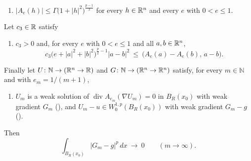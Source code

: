 \begin{helper}
\begin{enumerate}
  $|A(h)|\le\Gamma\bigl(1+|h|^2\bigr)^{\frac{p-1}2}$ for every $h\in\R^n$;
\item[(H13)] $|A_e(h)|\le\Gamma\bigl(1+|h|^2\bigr)^{\frac{p-1}2}$ for every
  $h\in\R^n$ and every $e$ with $0<e\le1$.
\end{enumerate}
Let $c_3\in\mathbb{R}$ satisfy
\begin{enumerate}
\item[(H14)] $c_3>0$ and, for every $e$ with $0<e\le1$ and all $a,b\in\mathbb{R}^n$,
  \[
  c_3\bigl(e+|a|^2+|b|^2\bigr)^{\frac p2-1}|a-b|^2
  \ \le\ \bigl(A_e(a)-A_e(b),\,a-b\bigr).
  \tag{M}
  \]
\end{enumerate}
Finally let $U\colon\mathbb{N}\to(\mathbb{R}^n\to\mathbb{R})$ and
$G\colon\mathbb{N}\to(\mathbb{R}^n\to\mathbb{R}^n)$ satisfy, for every $m\in\mathbb{N}$ and
with $e_m=1/(m+1)$,
\begin{enumerate}
\item[(H15)] $U_m$ is a weak solution of
  $\operatorname{div}A_{e_m}(\nabla U_m)=0$ in $B_R(x_0)$ with weak gradient
  $G_m$ (), and
  $U_m-u\in W^{1,p}_0(B_R(x_0))$ with weak gradient $G_m-g$
  ().
\end{enumerate}
Then
\[
\int_{B_R(x_0)}|G_m-g|^p\,dx\ \longrightarrow\ 0
\qquad(m\to\infty).
\]
\end{helper}
